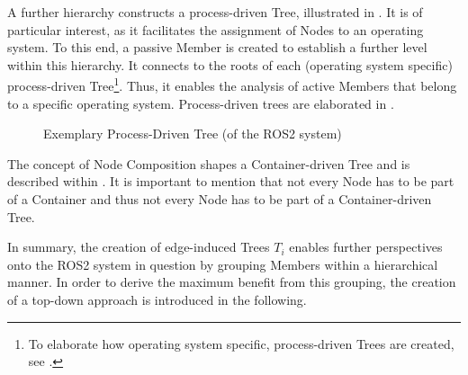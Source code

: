     A further hierarchy constructs a process-driven Tree, illustrated in . It is of particular interest, as it facilitates the assignment of Nodes to an operating system. To this end, a passive Member is created to establish a further level within this hierarchy. It connects to the roots of each (operating system specific) process-driven Tree\footnote{To elaborate how operating system specific, process-driven Trees are created, see .}. Thus, it enables the analysis of active Members that belong to a specific operating system. Process-driven trees are elaborated in .
    \begin{figure}[h]
        \centering
        \hspace*{-.17cm}
        \caption[Exemplary Process-Driven Tree]{Exemplary Process-Driven Tree (of the ROS2 system) \legend} \label{fig:tikz:mathModel:processesbig}
    \end{figure}

    The concept of Node Composition shapes a Container-driven Tree and is described within . It is important to mention that not every Node has to be part of a Container and thus not every Node has to be part of a Container-driven Tree.

    In summary, the creation of edge-induced Trees $T_i$ enables further perspectives onto the ROS2 system in question by grouping Members within a hierarchical manner. In order to derive the maximum benefit from this grouping, the creation of a top-down approach is introduced in the following.


